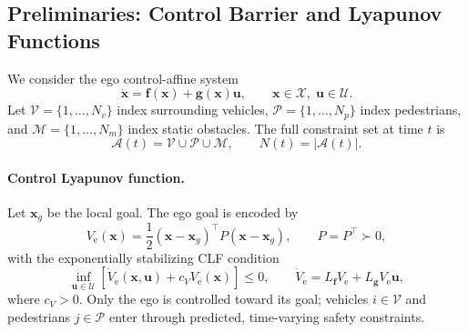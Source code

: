 
\subsection{Preliminaries: Control Barrier and Lyapunov Functions}

We consider the ego control-affine system
\begin{equation}
    \dot{\mathbf{x}}
    =
    \mathbf{f}(\mathbf{x})
    +
    \mathbf{g}(\mathbf{x})\mathbf{u},
    \qquad
    \mathbf{x}\in\mathcal{X},\;
    \mathbf{u}\in\mathcal{U}.
    \label{eq:prelim_control_affine}
\end{equation}
Let \(\mathcal{V}=\{1,\ldots,N_v\}\) index surrounding vehicles,
\(\mathcal{P}=\{1,\ldots,N_p\}\) index pedestrians, and
\(\mathcal{M}=\{1,\ldots,N_m\}\) index static obstacles.  The full
constraint set at time \(t\) is
\begin{equation}
    \mathcal{A}(t)
    =
    \mathcal{V}\cup\mathcal{P}\cup\mathcal{M},
    \qquad
    N(t)=|\mathcal{A}(t)|.
    \label{eq:prelim_constraint_set}
\end{equation}

\paragraph{Control Lyapunov function.}
Let \(\mathbf{x}_g\) be the local goal.  The ego goal is encoded by
\begin{equation}
    V_{\mathrm{e}}(\mathbf{x})
    =
    \frac{1}{2}
    (\mathbf{x}-\mathbf{x}_g)^\top
    P
    (\mathbf{x}-\mathbf{x}_g),
    \qquad
    P=P^\top\succ0,
    \label{eq:prelim_clf}
\end{equation}
with the exponentially stabilizing CLF condition
\begin{equation}
    \inf_{\mathbf{u}\in\mathcal{U}}
    \left[
    \dot{V}_{\mathrm{e}}(\mathbf{x},\mathbf{u})
    +
    c_VV_{\mathrm{e}}(\mathbf{x})
    \right]
    \le0,
    \qquad
    \dot{V}_{\mathrm{e}}
    =
    L_{\mathbf{f}}V_{\mathrm{e}}
    +
    L_{\mathbf{g}}V_{\mathrm{e}}\mathbf{u},
    \label{eq:prelim_clf_condition}
\end{equation}
where \(c_V>0\).  Only the ego is controlled toward its goal; vehicles
\(i\in\mathcal{V}\) and pedestrians \(j\in\mathcal{P}\) enter through
predicted, time-varying safety constraints.


